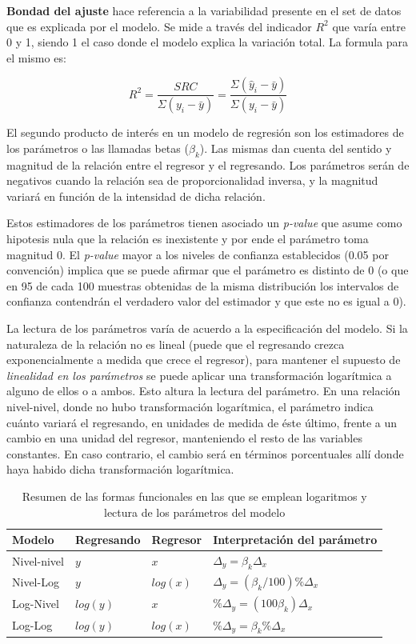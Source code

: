 \textbf{Bondad del ajuste} hace referencia a la variabilidad presente en el set de datos que es explicada por el modelo. Se mide a través del indicador $R^2$ que varía entre 0 y 1, siendo 1 el caso donde el modelo explica la variación total. La formula para el mismo es:

$$R^2 = \frac{SRC}{\Sigma(y_i - \bar{y})} = \frac{\Sigma(\hat{y}_i - \bar{y})}{\Sigma(y_i - \bar{y})} $$

El segundo producto de interés en un modelo de regresión son los estimadores de los parámetros o las llamadas betas ($\beta_k$). Las mismas dan cuenta del sentido y magnitud de la relación entre el regresor y el regresando. Los parámetros serán de negativos cuando la relación sea de proporcionalidad inversa, y la magnitud variará en función de la intensidad de dicha relación. 

Estos estimadores de los parámetros tienen asociado un \textit{p-value} que asume como hipotesis nula que la relación es inexistente y por ende el parámetro toma magnitud 0. El \textit{p-value} mayor a los niveles de confianza establecidos (0.05 por convención) implica que se puede afirmar que el parámetro es distinto de 0  (o que en 95 de cada 100 muestras obtenidas de la misma distribución los intervalos de confianza contendrán el verdadero valor del estimador y que este no es igual a 0).

La lectura de los parámetros varía de acuerdo a la especificación del modelo. Si la naturaleza de la relación no es lineal (puede que el regresando crezca exponencialmente a medida que crece el regresor), para mantener el supuesto de \textit{linealidad en los parámetros} se puede aplicar una transformación logarítmica a alguno de ellos o a ambos. Esto altura la lectura del parámetro. En una relación nivel-nivel, donde no hubo transformación logarítmica, el parámetro indica cuánto variará el regresando, en unidades de medida de éste último, frente a un cambio en una unidad del regresor, manteniendo el resto de las variables constantes. En caso contrario, el cambio será en términos porcentuales allí donde haya habido dicha transformación logarítmica.  

\begin{table}[h!]
	\centering
	\caption{Resumen de las formas funcionales en las que se emplean logaritmos y lectura de los parámetros del modelo}
	\label{tab:table1}
	\begin{tabular}{l|l|l|l}
		Modelo & Regresando & Regresor & Interpretación del parámetro\\
		\hline
		Nivel-nivel & $y$ & $x$ & $\Delta_y = \beta_k \Delta_x$\\
		\hline
		Nivel-Log & $y$ & $log(x)$ & $\Delta_y = (\beta_k / 100)\% \Delta_x$\\
		\hline
		Log-Nivel & $log(y)$ & $x$ & $ \% \Delta_y = (100 \beta_k) \Delta_x$\\
		\hline
		Log-Log & $log(y)$ & $log(x)$ & $ \% \Delta_y = \beta_k \% \Delta_x$\\
				
	\end{tabular}
\end{table}



